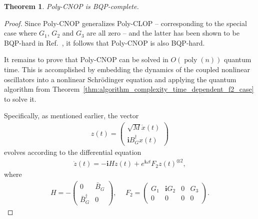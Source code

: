 \documentclass[10pt,a4paper]{amsart}
\theoremstyle{plain}
\newtheorem{thm}{Theorem}
\theoremstyle{definition}
\theoremstyle{remark}
\newcommand{\lrb}[1]{\left ( #1 \right )}
\newcommand{\mypoly}[1]{\operatorname{poly} \lrb{#1}}
\newcommand{\myO}[1]{O\lrb{#1}}
\renewcommand{\i}{\ensuremath{\mathbf{i}}}
\begin{document}
\begin{thm}
Poly-CNOP is BQP-complete.
\end{thm}

\begin{proof}
Since Poly-CNOP generalizes Poly-CLOP -- corresponding to the special case where $G_1$, $G_2$ and $G_3$ are all zero -- and the latter has been shown to be BQP-hard in Ref.~\cite{babbush2023exponential}, it follows that Poly-CNOP is also BQP-hard.

It remains to prove that Poly-CNOP can be solved in $\myO{\mypoly{n}}$ quantum time. This is accomplished by embedding the dynamics of the coupled nonlinear oscillators into a nonlinear Schr\"{o}dinger equation and applying the quantum algorithm from Theorem~\ref{thm:algorithm_complexity_time_dependent_f2_case} to solve it.

Specifically, as mentioned earlier, the vector
\begin{align}
z(t)=\begin{pmatrix}
    \sqrt{M}\dot{x}(t)\\
    \i B_G^\dagger x(t)
\end{pmatrix} 
\end{align}
evolves according to the differential equation
\begin{align}
\dot{z}(t) = -\i H z(t) + e^{\i \omega t} F_2 z(t)^{\otimes 2},    
\label{eq:nonlinear_schrodinger_equation_for_nonlinear_oscillators}
\end{align}
where
\begin{align}
H = -\begin{pmatrix}
0 & \bar{B}_G \\
\bar{B}_G^{\dagger} & 0
\end{pmatrix},~&~
F_2=\begin{pmatrix}
    G_1 & \i G_2 & 0 & G_3 \\
    0 & 0 & 0 & 0
\end{pmatrix}. 
\end{align}


\end{proof}
\end{document}
